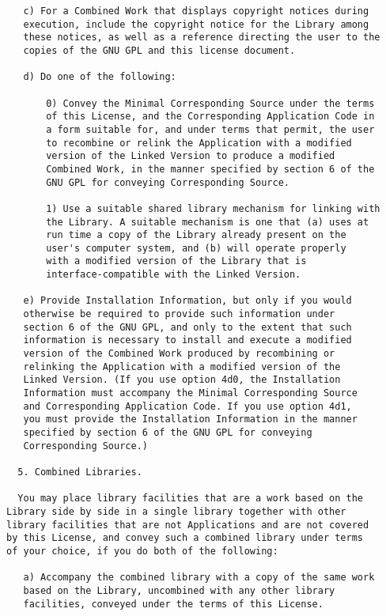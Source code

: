 \documentclass[11pt,twoside,fleqn,openright,titlepage]{cslreport}
\begin{document}
\begin{small}
\begin{verbatim}
   c) For a Combined Work that displays copyright notices during
   execution, include the copyright notice for the Library among
   these notices, as well as a reference directing the user to the
   copies of the GNU GPL and this license document.

   d) Do one of the following:

       0) Convey the Minimal Corresponding Source under the terms
       of this License, and the Corresponding Application Code in
       a form suitable for, and under terms that permit, the user
       to recombine or relink the Application with a modified
       version of the Linked Version to produce a modified
       Combined Work, in the manner specified by section 6 of the
       GNU GPL for conveying Corresponding Source.

       1) Use a suitable shared library mechanism for linking with
       the Library. A suitable mechanism is one that (a) uses at
       run time a copy of the Library already present on the
       user's computer system, and (b) will operate properly
       with a modified version of the Library that is
       interface-compatible with the Linked Version.

   e) Provide Installation Information, but only if you would
   otherwise be required to provide such information under
   section 6 of the GNU GPL, and only to the extent that such
   information is necessary to install and execute a modified
   version of the Combined Work produced by recombining or
   relinking the Application with a modified version of the
   Linked Version. (If you use option 4d0, the Installation
   Information must accompany the Minimal Corresponding Source
   and Corresponding Application Code. If you use option 4d1,
   you must provide the Installation Information in the manner
   specified by section 6 of the GNU GPL for conveying
   Corresponding Source.)

  5. Combined Libraries.

  You may place library facilities that are a work based on the
Library side by side in a single library together with other
library facilities that are not Applications and are not covered
by this License, and convey such a combined library under terms
of your choice, if you do both of the following:

   a) Accompany the combined library with a copy of the same work
   based on the Library, uncombined with any other library
   facilities, conveyed under the terms of this License.


\end{verbatim}
\end{small}
\end{document}
